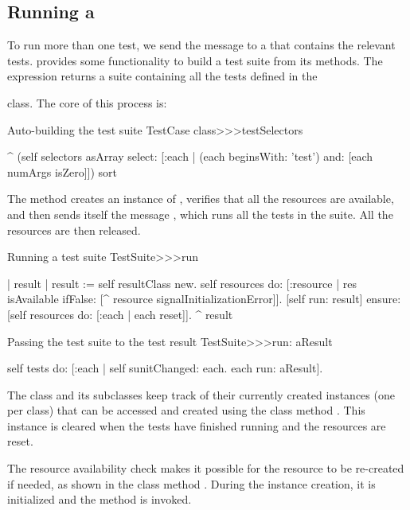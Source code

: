 \documentclass[a4paper,10pt,twoside]{book}
\begin{document}
\subsection{Running a }

To run more than one test, we send the message  to a  that contains the relevant tests.
 provides some functionality to build a test suite from its methods.
The expression  returns a suite containing all the tests defined in the { class.
The core of this process is:
\begin{method}[testcasetestselectors]{Auto-building the test suite}
TestCase class>>>testSelectors

	^ (self selectors asArray select: [:each | 
		(each beginsWith: 'test') and: [each numArgs isZero]]) sort
\end{method}

The method  creates an instance of , verifies that all the resources are available, and then sends itself the message , which runs all the tests in the suite.
All the resources are then released.
\begin{method}[testsuiterun]{Running a test suite}
TestSuite>>>run

	| result |
 	result := self resultClass new.
	self resources do: [:resource | 
		res isAvailable ifFalse: [^ resource signalInitializationError]].
	[self run: result] ensure: [self resources do: [:each | each reset]].
	^ result
\end{method}

\begin{method}[testsuiterun:]{Passing the test suite to the test result}
TestSuite>>>run: aResult

	self tests do: [:each |
		self sunitChanged: each.
		each run: aResult].
\end{method}
The class  and its subclasses keep track of their currently created instances (one per class) that can be accessed and created using the class method .
This instance is cleared when the tests have finished running and the resources are reset.

The resource availability check makes it possible for the resource to be re-created if needed, as shown in the class method .
During the  instance creation, it is initialized and the method  is invoked.

}
\end{document}
